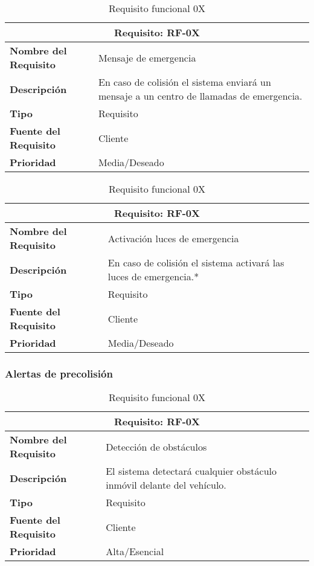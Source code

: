 \begin{table}[H]
\begin{center}
\begin{tabular}{p{} p{7cm}}
\multicolumn{2}{c}{\textbf{Requisito: RF-0X} } \\
\hline \hline
\textbf{Nombre del Requisito} & Mensaje de emergencia\\
\hline
\textbf{Descripción} &En caso de colisión el sistema enviará un mensaje a un centro de llamadas de emergencia.\\
\hline
\textbf{Tipo} & Requisito  \\
\hline
\textbf{Fuente del Requisito} & Cliente  \\
\hline
\textbf{Prioridad} & Media/Deseado  \\ \hline
\end{tabular}
\caption{Requisito funcional 0X}
\label{tab:personal}
\end{center}
\end{table}

\begin{table}[H]
\begin{center}
\begin{tabular}{p{} p{7cm}}
\multicolumn{2}{c}{\textbf{Requisito: RF-0X} } \\
\hline \hline
\textbf{Nombre del Requisito} & Activación luces de emergencia\\
\hline
\textbf{Descripción} & En caso de colisión el sistema activará las luces de emergencia.*\\
\hline
\textbf{Tipo} & Requisito  \\
\hline
\textbf{Fuente del Requisito} & Cliente  \\
\hline
\textbf{Prioridad} & Media/Deseado  \\ \hline
\end{tabular}
\caption{Requisito funcional 0X}
\label{tab:personal}
\end{center}
\end{table}

\subsubsection{Alertas de precolisión}

\begin{table}[H]
\begin{center}
\begin{tabular}{p{} p{7cm}}
\multicolumn{2}{c}{\textbf{Requisito: RF-0X} } \\
\hline \hline
\textbf{Nombre del Requisito} & Detección de obstáculos\\
\hline
\textbf{Descripción} &  El sistema detectará cualquier obstáculo inmóvil delante del vehículo.\\
\hline
\textbf{Tipo} & Requisito  \\
\hline
\textbf{Fuente del Requisito} & Cliente  \\
\hline
\textbf{Prioridad} & Alta/Esencial \\ \hline
\end{tabular}
\caption{Requisito funcional 0X}
\label{tab:personal}
\end{center}
\end{table}

